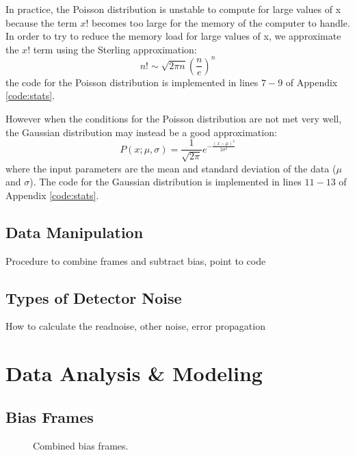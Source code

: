 \documentclass[preprint]{aastex62}
\begin{document}
In practice, the Poisson distribution is unstable to compute for large values of x because the term $x!$ becomes too large for the memory of the computer to handle. In order to try to reduce the memory load for large values of x, we approximate the $x!$ term using the Sterling approximation:
\begin{equation}
n! \sim \sqrt{2\pi n}\left(\frac{n}{e} \right)^n
\end{equation}
the code for the Poisson distribution is implemented in lines $7-9$ of Appendix \ref{code:stats}.

However when the conditions for the Poisson distribution are not met very well, the Gaussian distribution may instead be a good approximation:
\begin{equation}
P(x; \mu, \sigma) = \frac{1}{\sqrt{2\pi}} e^{-\frac{(x-\mu)^2}{2\sigma^2}}
\end{equation}
where the input parameters are the mean and standard deviation of the data ($\mu$ and $\sigma$). The code for the Gaussian distribution is implemented in lines $11-13$ of Appendix \ref{code:stats}. 

\subsection{Data Manipulation}
Procedure to combine frames and subtract bias, point to code

\subsection{Types of Detector Noise}
How to calculate the readnoise, other noise, error propagation

\section{Data Analysis \& Modeling}
\subsection{Bias Frames}

\begin{figure}[ht]
\caption{Combined bias frames.} \label{fig:bias}
\end{figure}
\end{document}
